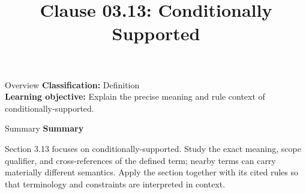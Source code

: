 \documentclass[10pt,letterpaper]{article}
\title{Clause 03.13: Conditionally Supported}
\author{}
\date{}
\begin{document}
\maketitle
\begin{CornellOverviewBox}{Overview}
\textbf{Classification:} Definition\\[2pt]
\textbf{Learning objective:} Explain the precise meaning and rule context of conditionally-supported.
\end{CornellOverviewBox}\begin{CornellSummaryBox}{Summary}
{\sffamily\bfseries\color{Accent} Summary}\par\vspace{3pt}Section 3.13 focuses on conditionally-supported. Study the exact meaning, scope qualifier, and cross-references of the defined term; nearby terms can carry materially different semantics. Apply the section together with its cited rules so that terminology and constraints are interpreted in context.
\end{CornellSummaryBox}
\end{document}
